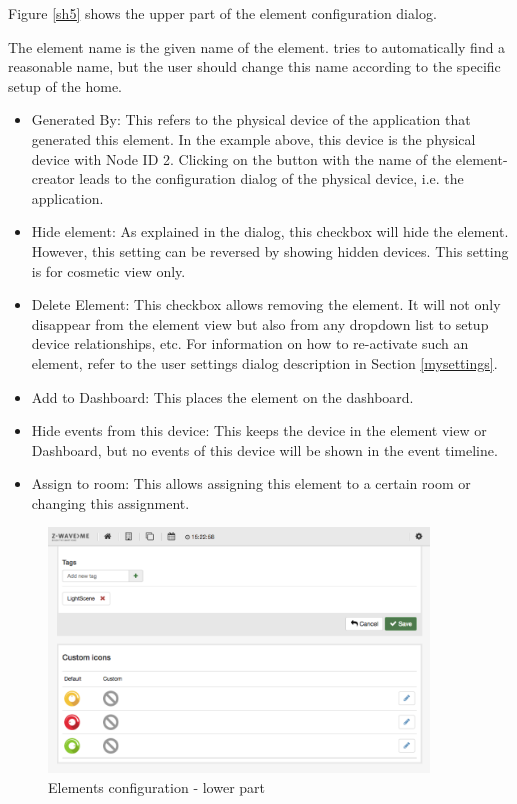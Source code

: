Figure \ref{sh5} shows the upper part of the element configuration dialog.

The element name  is the given name of the element. \zway tries to automatically find a 
reasonable name, but  the user should change this name according to the specific setup of 
the home.

\begin{itemize}
\item Generated By: This refers to the physical device of the \zway application that 
generated this element. In the example above, this device is the physical \zwave device 
with Node ID 2. Clicking on the button with the name of the element-creator leads to the 
configuration dialog of the physical device, i.e. the \zway application.

\item Hide element: As explained in the dialog, this checkbox will hide the element. However, 
this setting can be reversed by showing hidden devices. This setting is for cosmetic view only.

\item Delete Element: This checkbox allows removing the element. It will not only disappear 
from the element view but also from any dropdown list to setup device relationships, etc. 
For information on how to re-activate such an element, refer to the user settings dialog 
description in Section \ref{mysettings}.

\item Add to Dashboard: This places the element on the dashboard.

\item Hide events from this device: This keeps the device in the element view or Dashboard, but 
no events of this device will be shown in the event timeline.

\item Assign to room: This allows assigning this element to a certain room or changing 
this assignment.

\end{itemize}

\begin{figure}
\begin{center}
\includegraphics[width=0.9\textwidth]{pngs/cap4/sh6.png}
\caption{Elements configuration  - lower part}
\label{sh6}
\end{center}
\end{figure}

